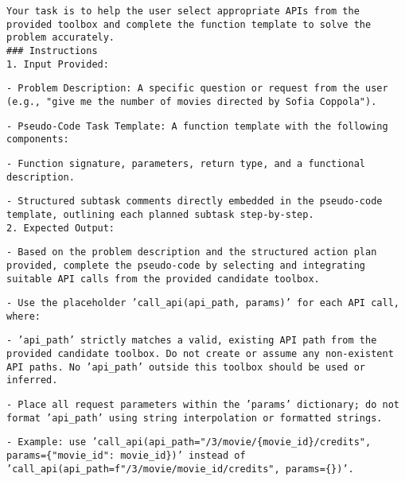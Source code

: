 \begin{figure*}[ht]
\centering
\begin{tcolorbox}[colback=white!95!blue, colframe=blue!40!, title=Prompt for Tool Selection Module $\mathcal{M}_{TS}$, width=\textwidth]
\small
\texttt{Your task is to help the user select appropriate APIs from the provided toolbox and complete the function template to solve the problem accurately.}\\

\texttt{\#\#\# Instructions}\\
\texttt{1. Input Provided:}\\
\parbox{2pt}{\hspace{8em}} \texttt{- Problem Description: A specific question or request from the user (e.g., "give me the number of movies directed by Sofia Coppola").}\\
\parbox{2pt}{\hspace{8em}} \texttt{- Pseudo-Code Task Template: A function template with the following components:}\\
\parbox{2pt}{\hspace{8em}} \quad \texttt{- Function signature, parameters, return type, and a functional description.}\\
\parbox{2pt}{\hspace{8em}} \quad \texttt{- Structured subtask comments directly embedded in the pseudo-code template, outlining each planned subtask step-by-step.}\\

\texttt{2. Expected Output:}\\
\parbox{2pt}{\hspace{8em}} \texttt{- Based on the problem description and the structured action plan provided, complete the pseudo-code by selecting and integrating suitable API calls from the provided candidate toolbox.}\\
\parbox{2pt}{\hspace{8em}} \texttt{- Use the placeholder 'call\_api(api\_path, params)' for each API call, where:}\\
\parbox{2pt}{\hspace{8em}} \quad \texttt{- 'api\_path' strictly matches a valid, existing API path from the provided candidate toolbox. Do not create or assume any non-existent API paths. No 'api\_path' outside this toolbox should be used or inferred.}\\
\parbox{2pt}{\hspace{8em}} \quad \texttt{- Place all request parameters within the 'params' dictionary; do not format 'api\_path' using string interpolation or formatted strings.}\\
\parbox{2pt}{\hspace{8em}} \quad \texttt{- Example: use 'call\_api(api\_path="\//3\//movie\//\{movie\_id\}\//credits", params=\{"movie\_id": movie\_id\})' instead of 'call\_api(api\_path=f"\//3\//movie\//{movie\_id}\//credits", params=\{\})'.}\\


\end{tcolorbox}
\end{figure*}
